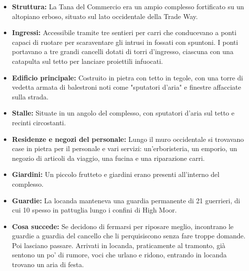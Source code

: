 \documentclass{article}
\begin{document}
\begin{itemize}
                
                    \item \textbf{Struttura:} La Tana del Commercio era un ampio complesso fortificato su un altopiano erboso, situato sul lato occidentale della Trade Way.
                    \item \textbf{Ingressi:} Accessibile tramite tre sentieri per carri che conducevano a ponti capaci di ruotare per scaraventare gli intrusi in fossati con spuntoni. I ponti portavano a tre grandi cancelli dotati di torri d'ingresso, ciascuna con una catapulta sul tetto per lanciare proiettili infuocati.
                    \item \textbf{Edificio principale:} Costruito in pietra con tetto in tegole, con una torre di vedetta armata di balestroni noti come "sputatori d'aria" e finestre affacciate sulla strada.
                    \item \textbf{Stalle:} Situate in un angolo del complesso, con sputatori d'aria sul tetto e recinti circostanti.
                    \item \textbf{Residenze e negozi del personale:} Lungo il muro occidentale si trovavano case in pietra per il personale e vari servizi: un'erboristeria, un emporio, un negozio di articoli da viaggio, una fucina e una riparazione carri.
                    \item \textbf{Giardini:} Un piccolo frutteto e giardini erano presenti all'interno del complesso.
                    \item \textbf{Guardie:} La locanda manteneva una guardia permanente di 21 guerrieri, di cui 10 spesso in pattuglia lungo i confini di High Moor.
                    \item \textbf{Cosa succede:} Se decidono di fermarsi per riposare meglio, incontrano le guardie a guardia del cancello che li perquisiscono senza fare troppe domande. Poi lasciano passare. Arrivati in locanda, praticamente al tramonto, già sentono un po' di rumore, voci che urlano e ridono, entrando in locanda trovano un aria di festa.
                
                \end{itemize}
                
\end{document}
